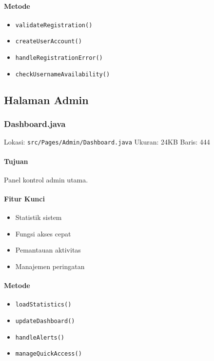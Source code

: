 \documentclass[12pt,a4paper]{article}
\begin{document}
\paragraph{Metode}
\begin{itemize}
    \item \texttt{validateRegistration()}
    \item \texttt{createUserAccount()}
    \item \texttt{handleRegistrationError()}
    \item \texttt{checkUsernameAvailability()}
\end{itemize}

\subsection{Halaman Admin}
\subsubsection{Dashboard.java}
Lokasi: \texttt{src/Pages/Admin/Dashboard.java}
Ukuran: 24KB
Baris: 444

\paragraph{Tujuan}
Panel kontrol admin utama.

\paragraph{Fitur Kunci}
\begin{itemize}
    \item Statistik sistem
    \item Fungsi akses cepat
    \item Pemantauan aktivitas
    \item Manajemen peringatan
\end{itemize}

\paragraph{Metode}
\begin{itemize}
    \item \texttt{loadStatistics()}
    \item \texttt{updateDashboard()}
    \item \texttt{handleAlerts()}
    \item \texttt{manageQuickAccess()}
\end{itemize}
\end{document}
